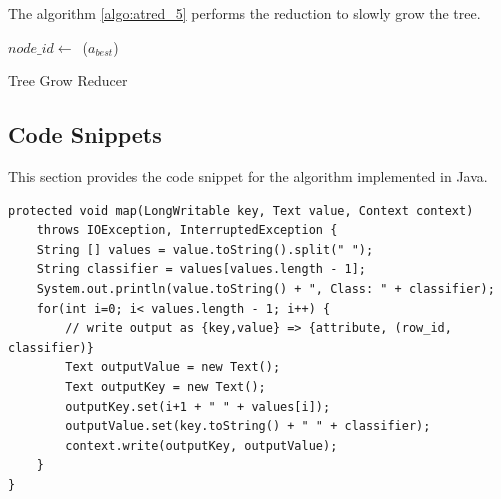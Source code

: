 \documentclass{article}
\begin{document}


The algorithm \ref{algo:atred_5} performs the reduction to slowly grow the tree.

\IncMargin{1em}
\begin{algorithm}[H]
\DontPrintSemicolon
{}
\BlankLine
$node\_id\leftarrow$\ \hash(${a_{best}}$)\;
\caption{Tree Grow Reducer\label{algo:atred_5}}
\end{algorithm}
\DecMargin{1em}


\subsection{Code Snippets}

This section provides the code snippet for the algorithm implemented in Java.

\begin{lstlisting}[caption={Attrib Table Mapper code snippet},label={lst:attrtblmap},style=MyJavaStyle]
protected void map(LongWritable key, Text value, Context context)
    throws IOException, InterruptedException {
    String [] values = value.toString().split(" ");
    String classifier = values[values.length - 1];
    System.out.println(value.toString() + ", Class: " + classifier);
    for(int i=0; i< values.length - 1; i++) {
        // write output as {key,value} => {attribute, (row_id, classifier)}
        Text outputValue = new Text();
        Text outputKey = new Text();
        outputKey.set(i+1 + " " + values[i]);
        outputValue.set(key.toString() + " " + classifier);
        context.write(outputKey, outputValue);
    }
}
\end{lstlisting}

\end{document}
